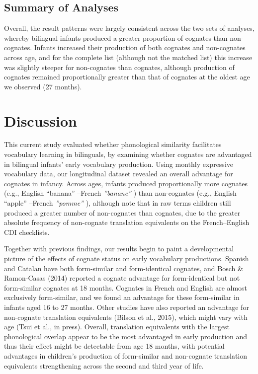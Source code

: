 \documentclass[
  english,
  ,man,floatsintext]{apa6}
\begin{document}
\hypertarget{summary-of-analyses}{%
\subsection{Summary of Analyses}\label{summary-of-analyses}}

Overall, the result patterns were largely consistent across the two sets of analyses, whereby bilingual infants produced a greater proportion of cognates than non-cognates. Infants increased their production of both cognates and non-cognates across age, and for the complete list (although not the matched list) this increase was slightly steeper for non-cognates than cognates, although production of cognates remained proportionally greater than that of cognates at the oldest age we observed (27 months).

\hypertarget{discussion}{%
\section{Discussion}\label{discussion}}

This current study evaluated whether phonological similarity facilitates vocabulary learning in bilinguals, by examining whether cognates are advantaged in bilingual infants' early vocabulary production. Using monthly expressive vocabulary data, our longitudinal dataset revealed an overall advantage for cognates in infancy. Across ages, infants produced proportionally more cognates (e.g., English ``banana'' --French \emph{''banane''} ) than non-cognates (e.g., English ``apple'' --French \emph{''pomme''} ), although note that in raw terms children still produced a greater number of non-cognates than cognates, due to the greater absolute frequency of non-cognate translation equivalents on the French--English CDI checklists.

Together with previous findings, our results begin to paint a developmental picture of the effects of cognate status on early vocabulary productions. Spanish and Catalan have both form-similar and form-identical cognates, and Bosch \& Ramon-Casas (2014) reported a cognate advantage for form-identical but not form-similar cognates at 18 months. Cognates in French and English are almost exclusively form-similar, and we found an advantage for these form-similar in infants aged 16 to 27 months. Other studies have also reported an advantage for non-cognate translation equivalents (Bilson et al., 2015), which might vary with age (Tsui et al., in press). Overall, translation equivalents with the largest phonological overlap appear to be the most advantaged in early production and thus their effect might be detectable from age 18 months, with potential advantages in children's production of form-similar and non-cognate translation equivalents strengthening across the second and third year of life.
\end{document}

